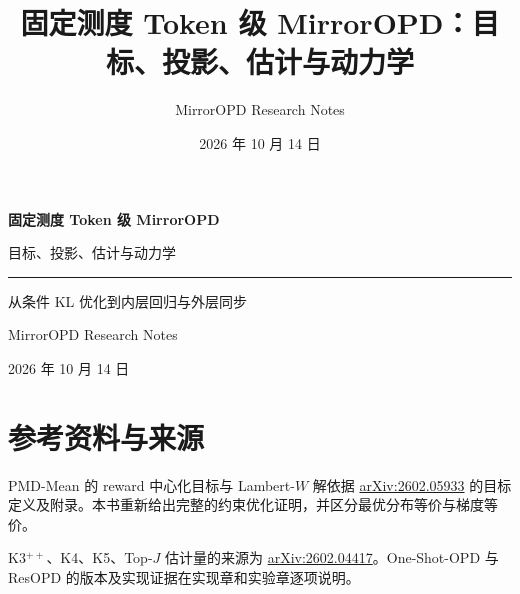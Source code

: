 \documentclass[lang=cn,scheme=chinese,openany]{elegantbook}
\title{固定测度 Token 级 MirrorOPD：目标、投影、估计与动力学}
\author{MirrorOPD Research Notes}
\date{2026 年 10 月 14 日}
\begin{document}
\begin{titlepage}
\centering
\vspace*{35mm}
{\Huge\bfseries 固定测度 Token 级 MirrorOPD\par}
\vspace{12mm}
{\Large 目标、投影、估计与动力学\par}
\vspace{16mm}
{\color{structurecolor}\rule{0.8\textwidth}{1pt}\par}
\vspace{12mm}
{\large 从条件 KL 优化到内层回归与外层同步\par}
\vfill
{\large MirrorOPD Research Notes\par}
\vspace{5mm}
{\large 2026 年 10 月 14 日\par}
\vspace{20mm}
\end{titlepage}
\frontmatter

\tableofcontents
\mainmatter









\backmatter
\chapter*{参考资料与来源}
\begingroup\raggedright
PMD-Mean 的 reward 中心化目标与 Lambert-$W$ 解依据 \href{https://arxiv.org/abs/2602.05933}{arXiv:2602.05933} 的目标定义及附录。本书重新给出完整的约束优化证明，并区分最优分布等价与梯度等价。
\par
K3$^{++}$、K4、K5、Top-$J$ 估计量的来源为 \href{https://arxiv.org/abs/2602.04417}{arXiv:2602.04417}。One-Shot-OPD 与 ResOPD 的版本及实现证据在实现章和实验章逐项说明。
\par\endgroup
\end{document}
